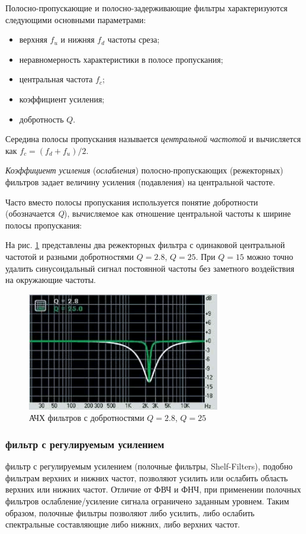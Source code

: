 \documentclass[oneside, final, 14pt]{extreport}
\begin{document}
Полосно-пропускающие и полосно-задерживающие фильтры характеризуются следующими основными параметрами:
\begin{itemize}
  \item верхняя $f_u$ и нижняя $f_d$ частоты среза;
  \item неравномерность характеристики в полосе пропускания;
  \item центральная частота $f_c$;
  \item коэффициент усиления;
  \item добротность $Q$.
\end{itemize}

Середина полосы пропускания называется \emph{центральной частотой} и вычисляется как $f_c=(f_d+f_u)/2$.

\emph{Коэффициент усиления} (\emph{ослабления}) полосно-пропускающих (режекторных) фильтров задает величину усиления (подавления) на центральной частоте.

Часто вместо полосы пропускания используется понятие добротности (обозначается \emph{Q}), вычисляемое как отношение центральной частоты к ширине полосы пропускания:
\(\)

На рис. \ref{pic-filter-05} представлены два режекторных фильтра с одинаковой центральной частотой и разными добротностями $Q=2.8$, $Q=25$. При $Q=15$ можно точно удалить синусоидальный сигнал постоянной частоты без заметного воздействия на окружающие частоты.

\begin{figure}[h]
  \centering
  \includegraphics[width=0.75\textwidth]{pic-filter-05}
  \caption{АЧХ фильтров с добротностями $Q=2.8$, $Q=25$}
  \label{pic-filter-05}
\end{figure}

\subsubsection{фильтр с регулируемым усилением}
фильтр с регулируемым усилением (полочные фильтры, Shelf-Filters), подобно фильтрам верхних и нижних частот, позволяют усилить или ослабить область верхних или нижних частот. Отличие от ФВЧ и ФНЧ, при применении полочных фильтров ослабление/усиление сигнала ограничено заданным уровнем. Таким образом, полочные фильтры позволяют либо усилить, либо ослабить спектральные составляющие либо нижних, либо верхних частот.
\end{document}
